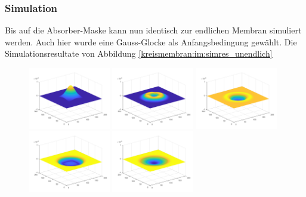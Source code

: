 \subsubsection{Simulation}
Bis auf die Absorber-Maske kann nun identisch zur endlichen Membran simuliert werden.
Auch hier wurde eine Gauss-Glocke als Anfangsbedingung gewählt. 
Die Simulationsresultate von Abbildung \ref{kreismembran:im:simres_unendlich}
\begin{figure}
	
	\begin{center}
		
		\includegraphics[width=0.32\textwidth]{papers/kreismembran/images/sim_2_1.png}
		\includegraphics[width=0.32\textwidth]{papers/kreismembran/images/sim_2_2.png}
		\includegraphics[width=0.32\textwidth]{papers/kreismembran/images/sim_2_3.png}
		\includegraphics[width=0.32\textwidth]{papers/kreismembran/images/sim_2_4.png}
		\includegraphics[width=0.32\textwidth]{papers/kreismembran/images/sim_2_5.png}

\end{center}
\end{figure}
